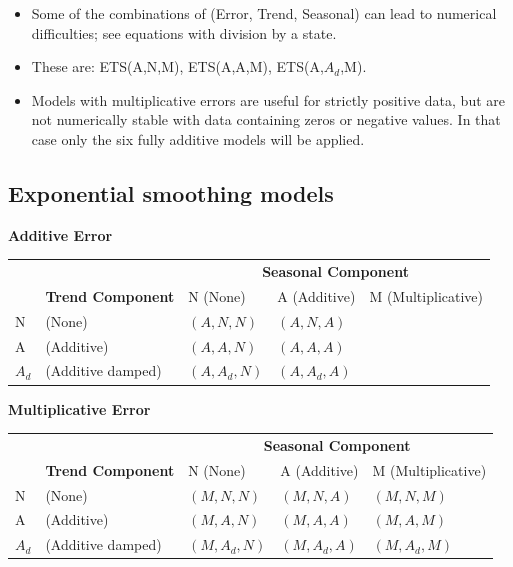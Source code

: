\documentclass[]{book}
\providecommand{\tightlist}{%
  \setlength{\itemsep}{0pt}\setlength{\parskip}{0pt}}
\begin{document}
\begin{itemize}
\tightlist
\item
  Some of the combinations of (Error, Trend, Seasonal) can lead to numerical difficulties; see equations with division by a state.
\item
  These are: ETS(A,N,M), ETS(A,A,M), ETS(A,\(A_d\),M).
\item
  Models with multiplicative errors are useful for strictly positive data, but are not numerically stable with data containing zeros or negative values. In that case only the six fully additive models will be applied.
\end{itemize}

\hypertarget{exponential-smoothing-models}{%
\subsection{Exponential smoothing models}\label{exponential-smoothing-models}}

\textbf{Additive Error}

\begin{table}[H]
\begin{tabular}{lllll}
 &                         & \multicolumn{3}{c}{\textbf{Seasonal Component}} \\
      & \textbf{Trend Component} & N (None)  & A (Additive)  & M (Multiplicative)  \\
N     &    (None)                      &  $(A,N,N)$          &  $(A,N,A)$              &                 \\
A     &     (Additive)                     &  $(A,A,N)$          &     $(A,A,A)$          &                  \\
$A_d$ &  (Additive damped)                         &       $(A,A_d,N)$    &      $(A,A_d,A)$          &                 
\end{tabular}
\end{table}

\newpage

\textbf{Multiplicative Error}

\begin{table}[H]
\begin{tabular}{lllll}
  &                       & \multicolumn{3}{c}{\textbf{Seasonal Component}} \\
      & \textbf{Trend Component} & N (None)  & A (Additive)  & M (Multiplicative)  \\
N     &    (None)                      &  $(M,N,N)$          &  $(M,N,A)$              &       $(M,N,M)$               \\
A     &     (Additive)                     &  $(M,A,N)$          &     $(M,A,A)$          &         $(M,A,M)$              \\
$A_d$ &  (Additive damped)                         &       $(M,A_d,N)$    &      $(M,A_d,A)$          &    $(M,A_d,M)$                 
\end{tabular}
\end{table}
\end{document}
